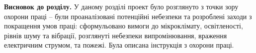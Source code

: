 \begin{comment}
\subsection{Вимоги безпеки в аварійних ситуаціях}
\begin{itemize}
  \item В аварійній обстановці слід сповістити про небезпеку оточуючих людей
    і діяти відповідно до плану ліквідації аварій.
  \item У разі виникнення спалаху або пожежі, необхідно негайно повідомити
    про це в пожежну частину, окриком попередити оточуючих людей і вжити
    заходів для гасіння пожежі.
  \item У випадках травмування і несправностей в устаткуванні працівник негайно
    припиняє роботу і повідомляє своєму безпосередньому начальникові про те,
    що трапилося, надає собі або іншому працівнику першу долікарську допомогу,
    за необхідності викликає швидку допомогу.
  \item У ситуаціях, які загрожують життю та здоров'ю - покинути небезпечну ділянку.
\end{itemize}
\end{comment}

\textbf{Висновок до розділу.} У даному розділі проект було розглянуто з точки зору охорони праці -- були проаналізовані потенційні небезпеки та розроблені заходи з покращення умов праці: сформульовано вимоги до мікроклімату, освітленості, рівнів шуму та вібрації, розглянуті небезпеки випромінювання, враження електричним струмом, та пожежі. Була описана інструкція з охорони праці.